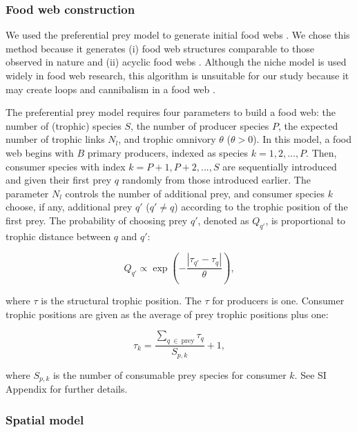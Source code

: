 \documentclass[11pt, class=article, crop=false]{standalone}
\begin{document}
\subsubsection{Food web construction}

We used the preferential prey model to generate initial food webs \citep{johnson_trophic_2014}.
We chose this method because it generates (i) food web structures comparable to those observed in nature and (ii) acyclic food webs \citep{shibasaki_food_2024}.
Although the niche model \citep{williams_simple_2000} is used widely in food web research, this algorithm is unsuitable for our study because it may create loops and cannibalism in a food web \citep{shibasaki_food_2024}.

The preferential prey model requires four parameters to build a food web: the number of (trophic) species $S$, the number of producer species $P$, the expected number of trophic links $N_l$, and trophic omnivory $\theta$ ($\theta > 0$).
In this model, a food web begins with $B$ primary producers, indexed as species $k = 1, 2, ..., P$.
Then, consumer species with index $k = P + 1, P + 2, ..., S$ are sequentially introduced and given their first prey $q$ randomly from those introduced earlier.
The parameter $N_l$ controls the number of additional prey, and consumer species $k$ choose, if any, additional prey $q'$ ($q' \ne q$) according to the trophic position of the first prey.
The probability of choosing prey $q'$, denoted as $Q_{q'}$, is proportional to trophic distance between $q$ and $q'$:

\begin{equation}
    Q_{q'} \propto \exp(-\frac{|\tau_{q'} - \tau_q|}{\theta}),
\end{equation}

where $\tau$ is the structural trophic position.
The $\tau$ for producers is one.
Consumer trophic positions are given as the average of prey trophic positions plus one:

\begin{equation}
    \tau_k = \frac{\sum_{q~\in~\text{prey}} \tau_q}{S_{p, k}} + 1,
\end{equation}

where $S_{p,k}$ is the number of consumable prey species for consumer $k$.
See SI Appendix for further details.

\subsubsection{Spatial model}
\end{document}
